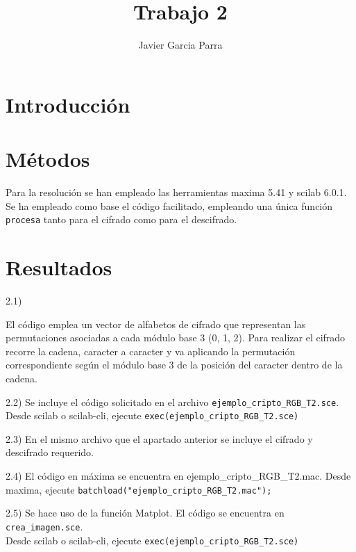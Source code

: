 \documentclass[fleqn,10pt]{wlscirep}
\title{Trabajo 2}
\author[50201633Q / jgarcia1285 ]{Javier Garcia Parra}
\begin{document}
\flushbottom
\maketitle
%
%
\thispagestyle{empty}


\section{Introducción}\label{introducciuxf3n}

\section{Métodos}\label{muxe9todos}

Para la resolución se han empleado las herramientas maxima 5.41 y scilab
6.0.1.\\
Se ha empleado como base el código facilitado, empleando una única
función \texttt{procesa} tanto para el cifrado como para el descifrado.

\section{Resultados}\label{resultados}

2.1)

El código emplea un vector de alfabetos de cifrado que representan las
permutaciones asociadas a cada módulo base 3 (0, 1, 2). Para realizar el
cifrado recorre la cadena, caracter a caracter y va aplicando la
permutación correspondiente según el módulo base 3 de la posición del
caracter dentro de la cadena.

2.2) Se incluye el código solicitado en el archivo
\texttt{ejemplo\_cripto\_RGB\_T2.sce}.\\
Desde scilab o scilab-cli, ejecute
\texttt{exec(\textquotesingle{}ejemplo\_cripto\_RGB\_T2.sce)}

2.3) En el mismo archivo que el apartado anterior se incluye el cifrado
y descifrado requerido.

2.4) El código en máxima se encuentra en ejemplo\_cripto\_RGB\_T2.mac.
Desde maxima, ejecute
\texttt{batchload("ejemplo\_cripto\_RGB\_T2.mac");}

2.5) Se hace uso de la función Matplot. El código se encuentra en
\texttt{crea\_imagen.sce}.\\
Desde scilab o scilab-cli, ejecute
\texttt{exec(\textquotesingle{}ejemplo\_cripto\_RGB\_T2.sce)}
\end{document}
